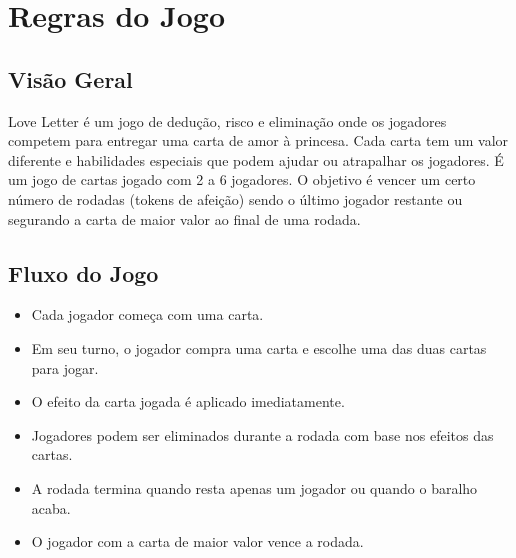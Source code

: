 \chapter{Regras do Jogo}\label{appendix:love-letter}
\section{Visão Geral}
Love Letter é um jogo de dedução, risco e eliminação onde os jogadores competem para entregar uma carta de amor à princesa. Cada carta tem um valor diferente e habilidades especiais que podem ajudar ou atrapalhar os jogadores. É um jogo de cartas jogado com 2 a 6 jogadores. O objetivo é vencer um certo número de rodadas (tokens de afeição) sendo o último jogador restante ou segurando a carta de maior valor ao final de uma rodada.

\section{Fluxo do Jogo}
\begin{itemize}
    \item Cada jogador começa com uma carta.
    \item Em seu turno, o jogador compra uma carta e escolhe uma das duas cartas para jogar.
    \item O efeito da carta jogada é aplicado imediatamente.
    \item Jogadores podem ser eliminados durante a rodada com base nos efeitos das cartas.
    \item A rodada termina quando resta apenas um jogador ou quando o baralho acaba.
    \item O jogador com a carta de maior valor vence a rodada.
\end{itemize}

